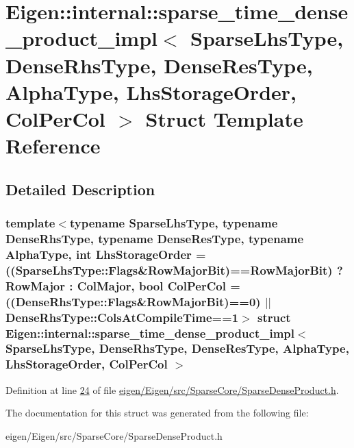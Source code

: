 \hypertarget{struct_eigen_1_1internal_1_1sparse__time__dense__product__impl}{}\section{Eigen\+:\+:internal\+:\+:sparse\+\_\+time\+\_\+dense\+\_\+product\+\_\+impl$<$ Sparse\+Lhs\+Type, Dense\+Rhs\+Type, Dense\+Res\+Type, Alpha\+Type, Lhs\+Storage\+Order, Col\+Per\+Col $>$ Struct Template Reference}
\label{struct_eigen_1_1internal_1_1sparse__time__dense__product__impl}


\subsection{Detailed Description}
\subsubsection*{template$<$typename Sparse\+Lhs\+Type, typename Dense\+Rhs\+Type, typename Dense\+Res\+Type, typename Alpha\+Type, int Lhs\+Storage\+Order = ((\+Sparse\+Lhs\+Type\+::\+Flags\&\+Row\+Major\+Bit)==\+Row\+Major\+Bit) ? Row\+Major \+: Col\+Major, bool Col\+Per\+Col = ((\+Dense\+Rhs\+Type\+::\+Flags\&\+Row\+Major\+Bit)==0) $\vert$$\vert$ Dense\+Rhs\+Type\+::\+Cols\+At\+Compile\+Time==1$>$\newline
struct Eigen\+::internal\+::sparse\+\_\+time\+\_\+dense\+\_\+product\+\_\+impl$<$ Sparse\+Lhs\+Type, Dense\+Rhs\+Type, Dense\+Res\+Type, Alpha\+Type, Lhs\+Storage\+Order, Col\+Per\+Col $>$}



Definition at line \hyperlink{eigen_2_eigen_2src_2_sparse_core_2_sparse_dense_product_8h_source_l00024}{24} of file \hyperlink{eigen_2_eigen_2src_2_sparse_core_2_sparse_dense_product_8h_source}{eigen/\+Eigen/src/\+Sparse\+Core/\+Sparse\+Dense\+Product.\+h}.



The documentation for this struct was generated from the following file\+:\begin{DoxyCompactItemize}
\item 
eigen/\+Eigen/src/\+Sparse\+Core/\+Sparse\+Dense\+Product.\+h\end{DoxyCompactItemize}
